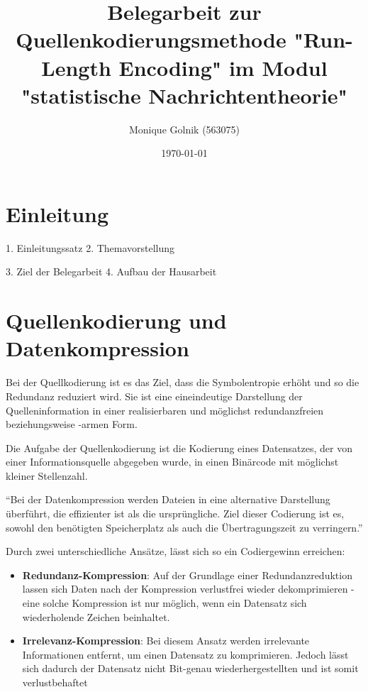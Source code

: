 \documentclass[11pt,a4paper,ngerman]{report}
\date{\today}
\title{Belegarbeit zur Quellenkodierungsmethode \textbf{"Run-Length Encoding"} im Modul "statistische Nachrichtentheorie"}
\author{Monique Golnik (563075)}
\begin{document}
	\maketitle
	\tableofcontents


	
	\chapter{Einleitung}
	
	1. Einleitungssatz
	2. Themavorstellung

	3. Ziel der Belegarbeit
	4. Aufbau der Hausarbeit


	\chapter{Quellenkodierung und Datenkompression}
	
		Bei der Quellkodierung ist es das Ziel, dass die Symbolentropie erhöht und so die Redundanz reduziert wird. Sie ist eine eineindeutige Darstellung der Quelleninformation in einer realisierbaren und möglichst redundanzfreien beziehungsweise -armen Form.
		
		Die Aufgabe der Quellenkodierung ist die Kodierung eines Datensatzes, der von einer Informationsquelle abgegeben wurde, in einen Binärcode mit möglichst kleiner Stellenzahl. \cite[Seite 47 ff.]{Lange2021}
	     
	    \enquote{Bei der Datenkompression werden Dateien in eine alternative Darstellung überführt, die effizienter ist als die ursprüngliche. Ziel dieser Codierung ist es, sowohl den benötigten Speicherplatz als auch die Übertragungszeit zu verringern.} \cite{IONOS} 
	
		Durch zwei unterschiedliche Ansätze, lässt sich so ein Codiergewinn erreichen:
	
		\begin{itemize}
		\item \textbf{Redundanz-Kompression}: 
		Auf der Grundlage einer Redundanzreduktion lassen sich Daten nach der Kompression verlustfrei wieder dekomprimieren - eine solche Kompression ist nur möglich, wenn ein Datensatz sich wiederholende Zeichen beinhaltet.
		
		\item \textbf{Irrelevanz-Kompression}:
		Bei diesem Ansatz werden irrelevante Informationen entfernt, um einen Datensatz zu komprimieren. Jedoch lässt sich dadurch der Datensatz nicht Bit-genau wiederhergestellten und ist somit verlustbehaftet
		\end{itemize}
	
\end{document}
